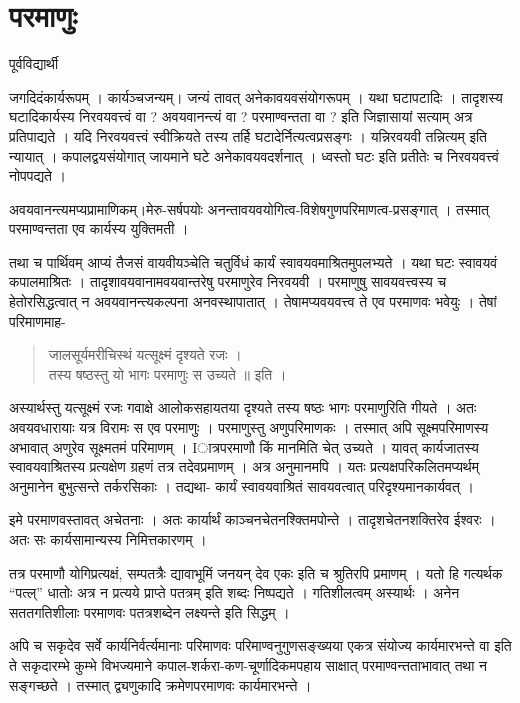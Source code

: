 \chapter{परमाणुः}

\begin{center}
\smallskip
पूर्वविद्यार्थी

\end{center}
जगदिदंकार्यरूपम् । कार्यञ्चजन्यम्। जन्यं तावत् अनेकावयवसंयोगरूपम् । यथा घटापटादिः । तादृशस्य घटादिकार्यस्य निरवयवत्त्वं वा ? अवयवानन्त्यं वा ? परमाण्वन्तता वा ? इति जिज्ञासायां सत्याम् अत्र प्रतिपाद्यते । यदि निरवयवत्त्वं स्वीक्रियते तस्य तर्हि घटादेर्नित्यत्वप्रसङ्गः । यन्निरवयवी तन्नित्यम् इति न्यायात् । कपालद्वयसंयोगात् जायमाने घटे अनेकावयवदर्शनात् । ध्वस्तो घटः इति प्रतीतेः च निरवयवत्त्वं नोपपद्यते ।

अवयवानन्त्यमप्यप्रामाणिकम्।मेरु-सर्षपयोः अनन्तावयवयोगित्व-विशेषगुणपरिमाणत्व-प्रसङ्गात् । तस्मात् परमाण्वन्तता एव कार्यस्य युक्तिमती ।

तथा च पार्थिवम् आप्यं तैजसं वायवीयञ्चेति चतुर्विधं कार्यं स्वावयवमाश्रितमुपलभ्यते । यथा घटः स्वावयवं कपालमाश्रितः । तादृशावयवानामवयवान्तरेषु परमाणुरेव निरवयवी । परमाणुषु सावयवत्त्वस्य च हेतोरसिद्धत्वात् न अवयवानन्त्यकल्पना अनवस्थापातात् । तेषामप्यवयवत्त्व ते एव परमाणवः भवेयुः । तेषां परिमाणमाह-
\begin{verse}
जालसूर्यमरीचिस्थं यत्सूक्ष्मं दृश्यते रजः ।\\
तस्य षष्ठस्तु यो भागः परमाणुः स उच्यते ॥ इति ।
\end{verse}
अस्यार्थस्तु यत्सूक्ष्मं रजः गवाक्षे आलोकसहायतया दृश्यते तस्य षष्ठः भागः परमाणुरिति गीयते । अतः अवयवधारायाः यत्र विरामः स एव परमाणुः । परमाणुस्तु अणुपरिमाणकः । तस्मात् अपि सूक्ष्मपरिमाणस्य अभावात् अणुरेव सूक्ष्मतमं परिमाणम् । Iात्रपरमाणौ किं मानमिति चेत् उच्यते । यावत् कार्यजातस्य स्वावयवाश्रितस्य प्रत्यक्षेण ग्रहणं तत्र तदेवप्रमाणम् । अत्र अनुमानमपि । यतः प्रत्यक्षपरिकलितमप्यर्थम् अनुमानेन बुभुत्सन्ते तर्करसिकाः । तद्यथा- कार्यं स्वावयवाश्रितं सावयवत्वात् परिदृश्यमानकार्यवत् ।

इमे परमाणवस्तावत् अचेतनाः । अतः कार्यार्थं काञ्चनचेतनश्क्तिमपोन्ते । तादृशचेतनशक्तिरेव ईश्वरः । अतः सः कार्यसामान्यस्य निमित्तकारणम् ।

तत्र परमाणौ योगिप्रत्यक्षं, सम्पतत्रैः द्यावाभूमिं जनयन् देव एकः इति च श्रुतिरपि प्रमाणम् । यतो हि गत्यर्थक “पत्ल्” धातोः अत्र न प्रत्यये प्राप्ते पतत्रम् इति शब्दः निष्पद्यते । गतिशीलत्वम् अस्यार्थः । अनेन सततगतिशीलाः परमाणवः पतत्रशब्देन लक्ष्यन्ते इति सिद्धम् ।

अपि च सकृदेव सर्वे कार्यनिर्वर्त्यमानाः परिमाणवः परिमाण्वनुगुणसङ्ख्यया एकत्र संयोज्य कार्यमारभन्ते वा इति ते सकृदारम्भे कुम्भे विभज्यमाने कपाल-शर्करा-कण-चूर्णादिकमपहाय साक्षात् परमाण्वन्तताभावात् तथा न सङ्गच्छते । तस्मात् द्व्यणुकादि क्रमेणपरमाणवः कार्यमारभन्ते । 

